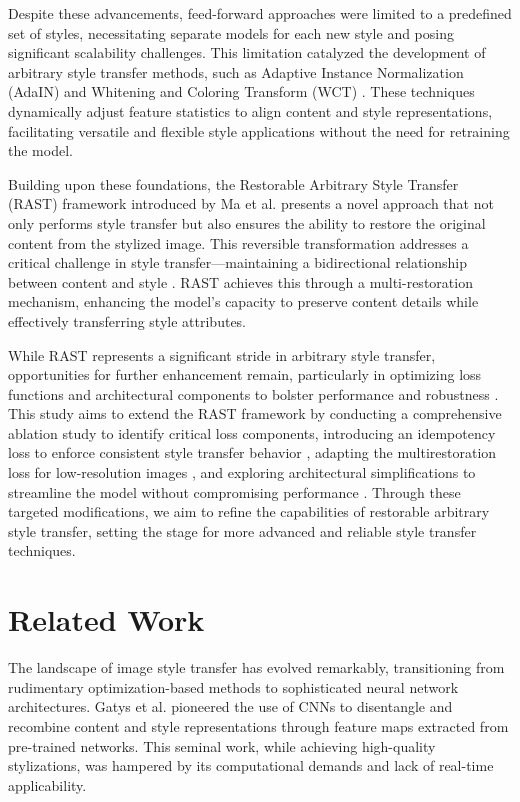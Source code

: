 \documentclass{article}
\begin{document}
Despite these advancements, feed-forward approaches were limited to a predefined set of styles, necessitating separate models for each new style and posing significant scalability challenges. This limitation catalyzed the development of arbitrary style transfer methods, such as Adaptive Instance Normalization (AdaIN) \cite{Huang2017} and Whitening and Coloring Transform (WCT) \cite{Li2017}. These techniques dynamically adjust feature statistics to align content and style representations, facilitating versatile and flexible style applications without the need for retraining the model.

Building upon these foundations, the Restorable Arbitrary Style Transfer (RAST) framework introduced by Ma et al. \cite{Ma2023RAST} presents a novel approach that not only performs style transfer but also ensures the ability to restore the original content from the stylized image. This reversible transformation addresses a critical challenge in style transfer—maintaining a bidirectional relationship between content and style \cite{CycleGAN2017}. RAST achieves this through a multi-restoration mechanism, enhancing the model's capacity to preserve content details while effectively transferring style attributes.

While RAST represents a significant stride in arbitrary style transfer, opportunities for further enhancement remain, particularly in optimizing loss functions and architectural components to bolster performance and robustness \cite{Liu2020, Wang2020}. This study aims to extend the RAST framework by conducting a comprehensive ablation study to identify critical loss components, introducing an idempotency loss to enforce consistent style transfer behavior \cite{SomeOtherPaper}, adapting the multirestoration loss for low-resolution images \cite{Li2018}, and exploring architectural simplifications to streamline the model without compromising performance \cite{Vazquez2018}. Through these targeted modifications, we aim to refine the capabilities of restorable arbitrary style transfer, setting the stage for more advanced and reliable style transfer techniques.

\section{Related Work}
\label{sec:related_work}

The landscape of image style transfer has evolved remarkably, transitioning from rudimentary optimization-based methods to sophisticated neural network architectures. Gatys et al. \cite{Gatys2016} pioneered the use of CNNs to disentangle and recombine content and style representations through feature maps extracted from pre-trained networks. This seminal work, while achieving high-quality stylizations, was hampered by its computational demands and lack of real-time applicability.
\end{document}
